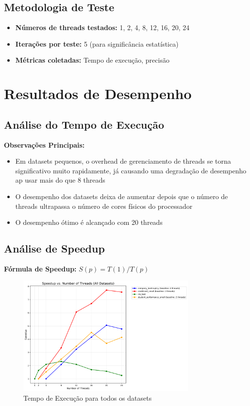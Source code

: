 \documentclass[a4paper,11pt]{article}
\begin{document}
\subsection{Metodologia de Teste}
\begin{itemize}
    \item \textbf{Números de threads testados:} 1, 2, 4, 8, 12, 16, 20, 24
    \item \textbf{Iterações por teste:} 5 (para significância estatística)
    \item \textbf{Métricas coletadas:} Tempo de execução, precisão
\end{itemize}

\section{Resultados de Desempenho}

\subsection{Análise do Tempo de Execução}







\textbf{Observações Principais:}
\begin{itemize}
    \item Em datasets pequenos, o overhead de gerenciamento de threads se torna significativo muito rapidamente, já causando uma degradação de desempenho ap usar mais do que 8 threads
    \item O desempenho dos datasets deixa de aumentar depois que o número de threads ultrapassa o número de cores físicos do processador
    \item O desempenho ótimo é alcançado com 20 threads
\end{itemize}

\subsection{Análise de Speedup}

\textbf{Fórmula de Speedup:} $S(p) = T(1) / T(p)$

\begin{figure}[H]
    \centering
    \includegraphics[width=0.8\textwidth]{../../results/graphs/all_datasets_speedup.png}
    \caption{Tempo de Execução para todos os datasets}
\end{figure}
\end{document}
